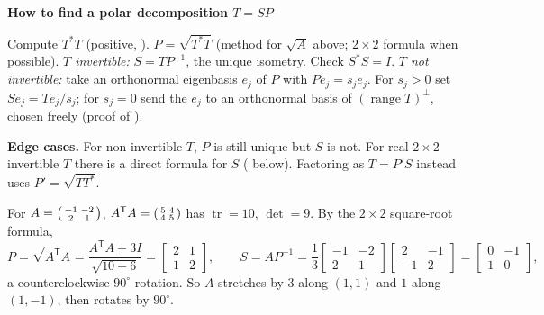 \documentclass[10pt]{scrartcl}
\DeclareMathOperator{\tr}{tr}\DeclareMathOperator{\nul}{null}\DeclareMathOperator{\range}{range}\DeclareMathOperator{\spn}{span}
\newenvironment{methodbox}[1]{\begin{mdframed}[style=mdbluebox,linecolor=NavyBlue,backgroundcolor=NavyBlue!3]\textbf{\color{NavyBlue}#1}\par\vspace{2pt}}{\end{mdframed}}
\begin{document}
\begin{methodbox}{How to find a polar decomposition $T=SP$}
\begin{enumerate}[label=\arabic*.,leftmargin=1.5em,itemsep=2pt,topsep=2pt]
  \ii Compute $T^*T$ (positive, ).
  \ii $P=\sqrt{T^*T}$ (method for $\sqrt A$ above; $2\times2$ formula when possible).
  \ii \emph{$T$ invertible:} $S=TP^{-1}$, the unique isometry. Check $S^*S=I$.
  \ii \emph{$T$ not invertible:} take an orthonormal eigenbasis $e_j$ of $P$ with $Pe_j=s_je_j$. For $s_j>0$ set $Se_j=Te_j/s_j$; for $s_j=0$ send the $e_j$ to an orthonormal basis of $(\range T)^\perp$, chosen freely (proof of ).
\end{enumerate}
\textbf{Edge cases.} For non-invertible $T$, $P$ is still unique but $S$ is not. For real $2\times2$ invertible $T$ there is a direct formula for $S$ ( below). Factoring as $T=P'S$ instead uses $P'=\sqrt{TT^*}$.
\end{methodbox}

\begin{example*}
  For $A=\begin{psmallmatrix}-1&-2\\2&1\end{psmallmatrix}$, $A^{\mathsf T}A=\begin{psmallmatrix}5&4\\4&5\end{psmallmatrix}$ has $\tr=10$, $\det=9$. By the $2\times2$ square-root formula,
  \[
    P=\sqrt{A^{\mathsf T}A}=\frac{A^{\mathsf T}A+3I}{\sqrt{10+6}}=\begin{bmatrix}2&1\\1&2\end{bmatrix},\qquad
    S = AP^{-1} = \frac{1}{3}\begin{bmatrix}-1&-2\\2&1\end{bmatrix}\begin{bmatrix}2&-1\\-1&2\end{bmatrix} = \begin{bmatrix}0&-1\\1&0\end{bmatrix},
  \]
  a counterclockwise $90^\circ$ rotation. So $A$ stretches by $3$ along $(1,1)$ and $1$ along $(1,-1)$, then rotates by $90^\circ$.
\end{example*}
\end{document}
